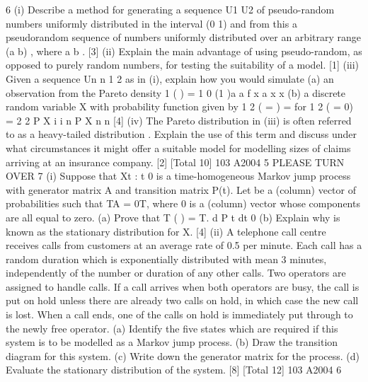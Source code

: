 
6 (i) Describe a method for generating a sequence U1 U2 of pseudo-random
numbers uniformly distributed in the interval (0 1) and from this a pseudorandom
sequence of numbers uniformly distributed over an arbitrary
range (a b) , where a b . [3]
(ii) Explain the main advantage of using pseudo-random, as opposed to purely
random numbers, for testing the suitability of a model. [1]
(iii) Given a sequence {Un n 1 2 } as in (i), explain how you would simulate
(a) an observation from the Pareto density
1 ( ) = 1 0
(1 )a
a
f x a x
x
(b) a discrete random variable X with probability function given by
1 2
( = ) = for 1 2 ( = 0) =
2 2
P X i i n P X
n n
[4]
(iv) The Pareto distribution in (iii) is often referred to as a heavy-tailed
distribution . Explain the use of this term and discuss under what
circumstances it might offer a suitable model for modelling sizes of claims
arriving at an insurance company. [2]
[Total 10]
103 A2004 5 PLEASE TURN OVER
7 (i) Suppose that {Xt : t 0} is a time-homogeneous Markov jump process with
generator matrix A and transition matrix P(t). Let be a (column) vector of
probabilities such that TA = 0T, where 0 is a (column) vector whose
components are all equal to zero.
(a) Prove that
T ( ) = T. d
P t
dt
0
(b) Explain why is known as the stationary distribution for X.
[4]
(ii) A telephone call centre receives calls from customers at an average rate of 0.5
per minute. Each call has a random duration which is exponentially
distributed with mean 3 minutes, independently of the number or duration of
any other calls. Two operators are assigned to handle calls. If a call arrives
when both operators are busy, the call is put on hold unless there are already
two calls on hold, in which case the new call is lost. When a call ends, one of
the calls on hold is immediately put through to the newly free operator.
(a) Identify the five states which are required if this system is to be
modelled as a Markov jump process.
(b) Draw the transition diagram for this system.
(c) Write down the generator matrix for the process.
(d) Evaluate the stationary distribution of the system.
[8]
[Total 12]
103 A2004 6



